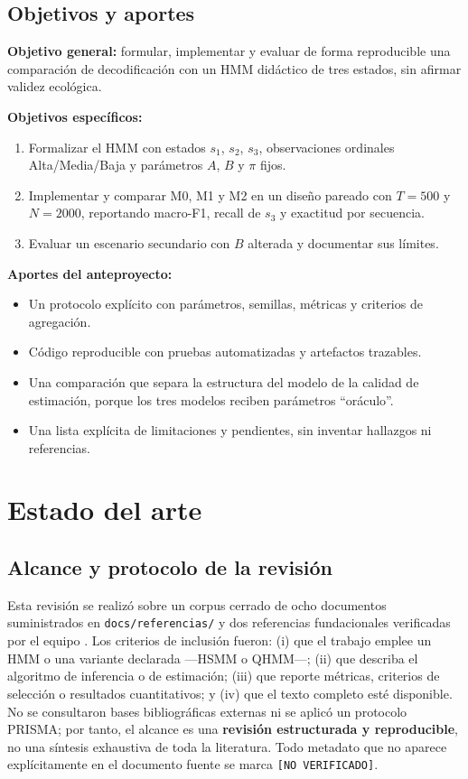 \documentclass[11pt,a4paper]{article}
\begin{document}
\subsection{Objetivos y aportes}

\textbf{Objetivo general:} formular, implementar y evaluar de forma reproducible una comparación de decodificación con un HMM didáctico de tres estados, sin afirmar validez ecológica.

\textbf{Objetivos específicos:}
\begin{enumerate}
  \item Formalizar el HMM con estados \(s_1\), \(s_2\), \(s_3\), observaciones ordinales Alta/Media/Baja y parámetros \(A\), \(B\) y \(\pi\) fijos.
  \item Implementar y comparar M0, M1 y M2 en un diseño pareado con \(T=500\) y \(N=2000\), reportando macro-F1, recall de \(s_3\) y exactitud por secuencia.
  \item Evaluar un escenario secundario con \(B\) alterada y documentar sus límites.
\end{enumerate}

\textbf{Aportes del anteproyecto:}
\begin{itemize}
  \item Un protocolo explícito con parámetros, semillas, métricas y criterios de agregación.
  \item Código reproducible con pruebas automatizadas y artefactos trazables.
  \item Una comparación que separa la estructura del modelo de la calidad de estimación, porque los tres modelos reciben parámetros ``oráculo''.
  \item Una lista explícita de limitaciones y pendientes, sin inventar hallazgos ni referencias.
\end{itemize}

\section{Estado del arte}

\subsection{Alcance y protocolo de la revisión}

Esta revisión se realizó sobre un corpus cerrado de ocho documentos suministrados en \texttt{docs/referencias/} y dos referencias fundacionales verificadas por el equipo \cite{rabiner1989,baum1970}. Los criterios de inclusión fueron: (i) que el trabajo emplee un HMM o una variante declarada ---HSMM o QHMM---; (ii) que describa el algoritmo de inferencia o de estimación; (iii) que reporte métricas, criterios de selección o resultados cuantitativos; y (iv) que el texto completo esté disponible. No se consultaron bases bibliográficas externas ni se aplicó un protocolo PRISMA; por tanto, el alcance es una \textbf{revisión estructurada y reproducible}, no una síntesis exhaustiva de toda la literatura. Todo metadato que no aparece explícitamente en el documento fuente se marca \texttt{[NO VERIFICADO]}.
\end{document}
